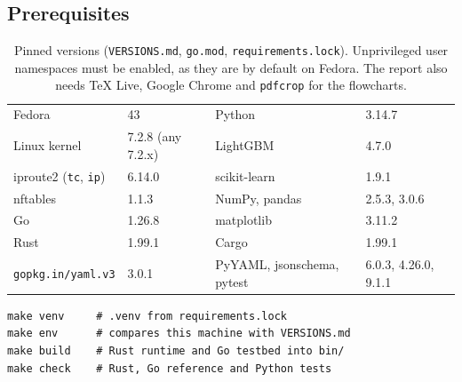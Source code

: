 \documentclass[11pt,a4paper]{article}
\begin{document}
\subsection*{Prerequisites}
\begin{table}[H]\centering\small
\begin{tabular}{@{}ll@{\hspace{2em}}ll@{}}
\toprule
Fedora & 43 & Python & 3.14.7 \\
Linux kernel & 7.2.8 (any 7.2.x) & LightGBM & 4.7.0 \\
iproute2 (\texttt{tc}, \texttt{ip}) & 6.14.0 & scikit-learn & 1.9.1 \\
nftables & 1.1.3 & NumPy, pandas & 2.5.3, 3.0.6 \\
Go & 1.26.8 & matplotlib & 3.11.2 \\
Rust & 1.99.1 & Cargo & 1.99.1 \\
\texttt{gopkg.in/yaml.v3} & 3.0.1 & PyYAML, jsonschema, pytest & 6.0.3, 4.26.0, 9.1.1 \\
\bottomrule
\end{tabular}
\caption{Pinned versions (\texttt{VERSIONS.md}, \texttt{go.mod}, \texttt{requirements.lock}). Unprivileged user namespaces must be enabled, as they are by default on Fedora. The report also needs TeX Live, Google Chrome and \texttt{pdfcrop} for the flowcharts.}
\end{table}
\begin{verbatim}
make venv     # .venv from requirements.lock
make env      # compares this machine with VERSIONS.md
make build    # Rust runtime and Go testbed into bin/
make check    # Rust, Go reference and Python tests
\end{verbatim}
\end{document}
